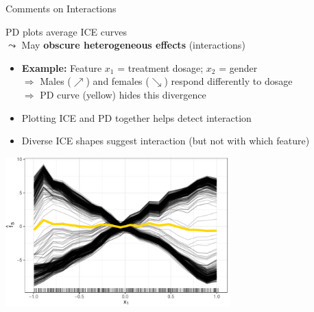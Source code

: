 \documentclass[10pt,compress,t,notes=noshow, xcolor=table]{beamer}
\begin{document}
\begin{frame}{Comments on Interactions}

PD plots average ICE curves \\$\leadsto$ May \textbf{obscure heterogeneous effects} (interactions)
    \begin{itemize}
      \item \textbf{Example:} Feature $x_1$ = treatment dosage; $x_2$ = gender \\
      \(\Rightarrow\)  Males ($\nearrow$) and females ($\searrow$) respond differently to dosage\\
      \(\Rightarrow\)  PD curve (yellow) hides this divergence
      \item Plotting ICE and PD together helps detect interaction
      \item Diverse ICE shapes suggest interaction  (but not with which feature)
    \end{itemize}
    
\begin{center}\includegraphics[width=0.65\textwidth]{figure/pdp_xor.pdf} \end{center}



\end{frame}
\end{document}
